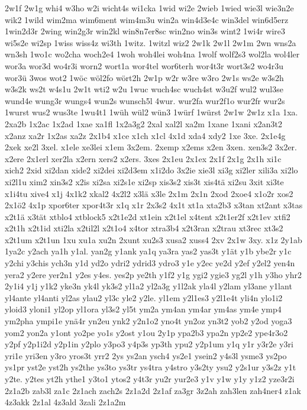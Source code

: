 {2w1f
2w1g
whi4
w3ho
w2i
wicht4s
wi1cka
1wid
wi2e
2wieb
1wied
wie3l
wie3n2e
wik2
1wild
wim2ma
wim6ment
wim4m3u
win2a
win4d3e4c
win3del
win6d5erz
1win2d3r
2wing
win2g3r
win2kl
win8n7er8sc
win2no
win3s
wint2
1wi4r
wire3
wi5s2e
wi2sp
1wiss
wiss4z
wi3th
1witz.
1witzl
wiz2
2w1k
2w1l
2w1m
2wn
wns2a
wn3sh
1wo1c
wo2cha
woch2e4
1woh
woh4lei
woh4na
1wolf
wolf2s3
wol2la
wol4ler
wor3a
wor3d
wo4r3i
worn2
wort1a
wor4tel
wor6terh
wor4t3r
wort3s2
wo4r3u
wor3ü
3wos
wot2
1wöc
wöl2fo
wört2h
2w1p
w2r
w3re
w3ro
2w1s
ws2e
w3s2h
w3s2k
ws2t
w4s1u
2w1t
wti2
w2u
1wuc
wuch4sc
wuch4st
w3u2f
wul2
wul3se
wund4e
wung3r
wungs4
wun2s
wunsch5l
4wur.
wur2fa
wur2f1o
wur2fr
wur2s
1wurst
wus2
wus3te
1wu4t1
1wüh
wül2
wün3
1würf
1würst
2w1w
2w1z
x1a
1xa.
2xa2b
1x2ac
1x2ad
1xae
xa1fl
1x2a3g2
2xal
xal2l
xa2m
1xane
1xani
x2an3t2
x2anz
xa2r
1x2as
xa2z
2x1b4
x1ce
x1ch
x1cl
4x1d
xda4
xdy2
1xe
3xe.
2x1e4g
2xek
xe2l
3xel.
x1ele
xe3lei
x1em
3x2em.
2xemp
x2ems
x2en
3xen.
xen3s2
3x2er.
x2ere
2x1erl
xer2la
x2ern
xers2
x2ers.
3xes
2x1eu
2x1ex
2x1f
2x1g
2x1h
xi1c
xich2
2xid
xi2dan
xide2
xi2dei
xi2d3em
x1i2do
3x2ie
xie3l
xi3g
xi2ler
xili3a
xi2lo
xi2l1u
xim2
xin3s2
x2is
xi2sa
xi2s1e
xi2sp
xis3s2
xis3t
xis4tä
xi2su
3xit
xi3te
x1i4tu
xive4
x1j
4x1k2
xkal2
4x2l2
x3lä
x3le
2x1m
2x1n
2xod
2xoe4
x1o2r
xos2
2x1ö2
4x1p
xpor6ter
xpor4t3r
x1q
x1r
2x3s2
4x1t
xt1a
xta2b3
x3tan
xt2ant
x3tas
x2t1ä
x3tät
xtblo4
xtblock5
x2t1e2d
xt1ein
x2t1el
x4tent
x2t1er2f
x2t1ev
xtfi2
x2t1h
x2t1id
xti2la
x2til2l
x2t1o4
x4tor
xtra3b4
x2t3ran
x2trau
xt3rec
xt3s2
x2t1um
x2t1un
1xu
xu1a
xu2n
2xunt
xu2s3
xusa2
xuss4
2xv
2x1w
3xy.
x1z
2y1ab
1ya2c
y2ach
ya1h
y1al.
yan2g
y1ank
ya1q
ya3ra
yas2
yas3t
y1ät
y1b
ybe2r
y1c
y2chi
y3chis
ych3n
y1d
yd2o
ydri2
ydrid3
ydro3
y1e
y2ec
ye2d
y2ef
y2el2
yen4n
yera2
y2ere
yer2n1
y2es
y4es.
yes2p
ye2th
y1f2
y1g
ygi2
ygie3
yg2l
y1h
y3ho
yhr2
2y1i4
y1j
y1k2
yke3n
yk4l
yk3s2
yl1a2
yl2a3g
y1l2ak
yla4l
y2lam
yl3ane
y1lant
yl4ante
yl4anti
yl2as
ylau2
yl3c
yle2
y2le.
yl1em
y2l1es3
y2l1e4t
yli4n
ylo1i2
yloid3
yloni1
yl2op
yl1ora
yl3s2
yl5t
ym2a
ym4an
ym4ar
ym4as
ym4e
ymp4
ym2pha
ympi1e
ynä4r
yn2eu
ynk2
y2n1o2
yno4t
yn2oz
yn3t2
yob2
y2od
yoga3
yom2
yon2a
y1ont
yo2pe
yo1s
y2ost
y1ou
2y1p
ypa2b3
ypa2n
yp2e2
ype4r3o2
y2pf
y2p1i2d
y2p1in
y2plo
y3po3
y4p3s
yp3th
ypu2
y2p1um
y1q
y1r
y3r2e
y3ri
yri1e
yri3en
y3ro
yros3t
yrr2
2ys
ys2an
ysch4
ys2e1
ysein2
y4s3l
ysme3
ys2po
ys1pr
yst2e
yst2h
ys2the
ys3to
ys3tr
ys4tra
y4stro
y3s2ty
ysu2
y2s1ur
y3s2z
y1t
y2te.
y2tes
yt2h
ythe1
y3to1
ytos2
y4t3r
yu2r
yur2e3
y1v
y1w
y1y
y1z2
yze3r2i
2z1a2b
zab3l
za1c
2z1ach
zach2s
2z1a2d
2z1af
za3gr
3z2ah
zah3len
zah4ner4
z1ak
4z3akk
2z1al
4z3ald
3zali
2z1a2m
}
